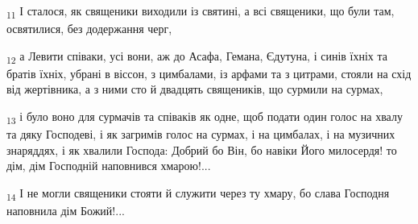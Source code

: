 \begin{tcolorbox}
\textsubscript{11} І сталося, як священики виходили із святині, а всі священики, що були там, освятилися, без додержання черг,
\end{tcolorbox}
\begin{tcolorbox}
\textsubscript{12} а Левити співаки, усі вони, аж до Асафа, Гемана, Єдутуна, і синів їхніх та братів їхніх, убрані в віссон, з цимбалами, із арфами та з цитрами, стояли на схід від жертівника, а з ними сто й двадцять священиків, що сурмили на сурмах,
\end{tcolorbox}
\begin{tcolorbox}
\textsubscript{13} і було воно для сурмачів та співаків як одне, щоб подати один голос на хвалу та дяку Господеві, і як загримів голос на сурмах, і на цимбалах, і на музичних знаряддях, і як хвалили Господа: Добрий бо Він, бо навіки Його милосердя! то дім, дім Господній наповнився хмарою!...
\end{tcolorbox}
\begin{tcolorbox}
\textsubscript{14} І не могли священики стояти й служити через ту хмару, бо слава Господня наповнила дім Божий!...
\end{tcolorbox}
